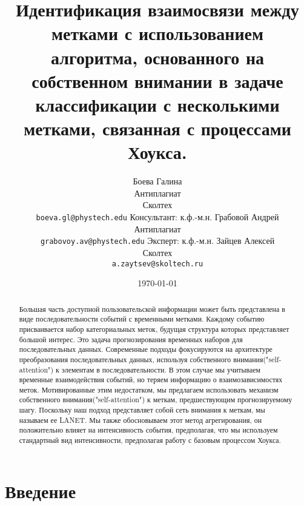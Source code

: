 \documentclass[a4paper, 12pt]{article} %
\title{Идентификация взаимосвязи между метками с использованием алгоритма, основанного на собственном внимании в задаче классификации с несколькими метками, связанная с процессами Хоукса.}
\author{ Боева Галина\\
	Антиплагиат\\
	Сколтех\\ 
	\texttt{boeva.gl@phystech.edu} 
	\AND
        Консультант: к.ф.-м.н. Грабовой Андрей\\
	Антиплагиат\\
	\texttt{grabovoy.av@phystech.edu} 
        \AND
        Эксперт: к.ф.-м.н. Зайцев Алексей\\
	Сколтех\\
	\texttt{a.zaytsev@skoltech.ru}
}
\date{\today}
\begin{document}
\maketitle

\begin{abstract}
Большая часть доступной пользовательской информации может быть представлена в виде последовательности событий с временными метками. Каждому событию присваивается набор категориальных меток, будущая структура которых представляет большой интерес. Это задача прогнозирования временных наборов для последовательных данных. Современные подходы фокусируются на архитектуре преобразования последовательных данных, используя собственного внимания("self-attention") к элементам в последовательности. В этом случае мы учитываем временные взаимодействия событий, но теряем информацию о взаимозависимостях меток. Мотивированные этим недостатком, мы предлагаем использовать механизм собственного внимания("self-attention") к меткам, предшествующим прогнозируемому шагу. Поскольку наш подход представляет собой сеть внимания к меткам, мы называем ее LANET. Мы также обосновываем этот метод агрегирования, он положительно влияет на интенсивность события, предполагая, что мы используем стандартный вид интенсивности, предполагая работу с базовым процессом Хоукса.
\end{abstract}



\section{Введение}
 


\end{document}
